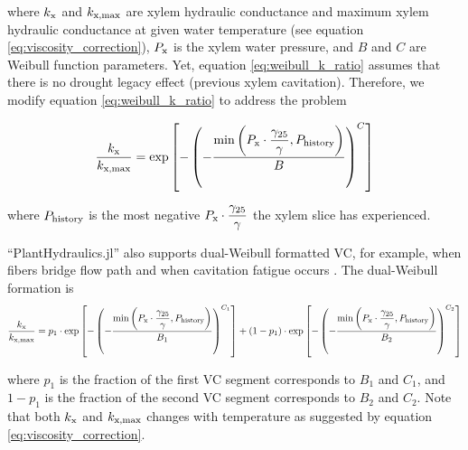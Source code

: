 \documentclass[twoside,10pt]{report}
\begin{document}
\par \noindent where $k_\text{x}$ and $k_\text{x,max}$ are xylem hydraulic conductance and maximum xylem hydraulic conductance at given water temperature (see equation \ref{eq:viscosity_correction}), $P_\text{x}$ is the xylem water pressure, and $B$ and $C$ are Weibull function parameters. Yet, equation \ref{eq:weibull_k_ratio} assumes that there is no drought legacy effect (previous xylem cavitation). Therefore, we modify equation \ref{eq:weibull_k_ratio} to address the problem

\begin{equation}
    \dfrac{k_\text{x}}{k_\text{x,max}} =
        \exp \left[ -\left( -\dfrac{ \min \left( P_\text{x} \cdot \dfrac{\gamma_\text{25}}{\gamma}, P_\text{history} \right)}{B} \right) ^ C \right]
    \label{eq:drought_history}
\end{equation}

\par \noindent where $P_\text{history}$ is the most negative $P_\text{x} \cdot \dfrac{\gamma_\text{25}}{\gamma}$ the xylem slice has experienced.

\par ``PlantHydraulics.jl'' also supports dual-Weibull formatted VC, for example, when fibers bridge flow path \citep{cai2014recalcitrant} and when cavitation fatigue occurs \citep{feng2015investigations}. The dual-Weibull formation is
\begin{equation}
    \dfrac{k_\text{x}}{k_\text{x,max}} =
        p_1 \cdot \exp \left[ -\left( -\dfrac{ \min \left( P_\text{x} \cdot \dfrac{\gamma_\text{25}}{\gamma}, P_\text{history} \right)}{B_1} \right) ^ {C_1} \right] + 
        (1 - p_1) \cdot \exp \left[ -\left( -\dfrac{ \min \left( P_\text{x} \cdot \dfrac{\gamma_\text{25}}{\gamma} , P_\text{history} \right)}{B_2} \right) ^ {C_2} \right]
    \label{eq:dual_weibull}
\end{equation}
\par \noindent where $p_1$ is the fraction of the first VC segment corresponds to $B_1$ and $C_1$, and $1 - p_1$ is the fraction of the second VC segment corresponds to $B_2$ and $C_2$. Note that both $k_\text{x}$ and $k_\text{x,max}$ changes with temperature as suggested by equation \ref{eq:viscosity_correction}.
\end{document}
